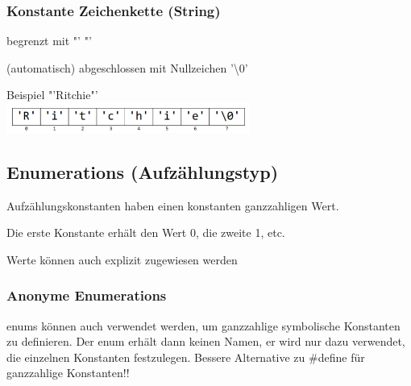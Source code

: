 		\subsubsection{Konstante Zeichenkette (String)}
 			\begin{minipage}[t]{9 cm}
 				\begin{compactitem}
 					\item begrenzt mit "'  "'
 					\item (automatisch) abgeschlossen mit Nullzeichen '\textbackslash0'
 				\end{compactitem}	
 			\end{minipage}
 			\hspace*{0.5cm}
 			\begin{minipage}[t]{9 cm}
 				Beispiel "'Ritchie"'\\
 				\includegraphics[width=0.6\textwidth]{pics/Zeichenkonstante.png}
 			\end{minipage}
 	\subsection{Enumerations (Aufzählungstyp)}
 		\begin{minipage}[t]{9 cm}
	 		\vspace*{-0.5cm}
	 		
 		\end{minipage}
 		\hspace*{0.5 cm}
 		\begin{minipage}[t]{8 cm}
 			\begin{compactitem}
 				\item Aufzählungskonstanten haben einen konstanten ganzzahligen Wert.
 				\item Die erste Konstante erhält den Wert 0, die zweite 1, etc.
 				\item Werte können auch explizit zugewiesen werden
 			\end{compactitem}
 		\end{minipage}
 		
 		\subsubsection{Anonyme Enumerations}
 			enums können auch verwendet werden, um ganzzahlige symbolische Konstanten zu definieren. Der enum erhält dann keinen Namen, er wird nur dazu verwendet, die einzelnen Konstanten festzulegen. Bessere Alternative zu \#define für ganzzahlige Konstanten!!
 			
 			\vspace*{0.5cm}